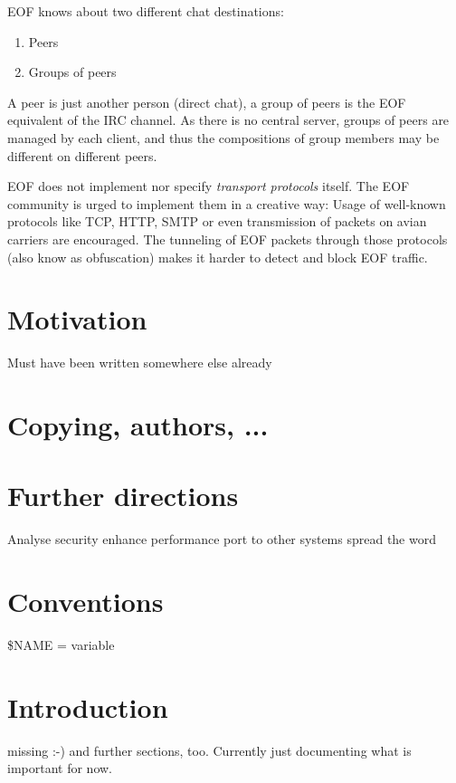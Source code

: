 \documentclass[12pt,a4paper]{book}
\begin{document}
EOF knows about two different chat destinations:
\begin{enumerate}
\item Peers
\item Groups of peers
\end{enumerate}
A peer is just another person (direct chat), a group of peers is the EOF
equivalent of the IRC channel\cite{irc-1}. As there is no central server,
groups of peers are managed by each client, and thus the compositions of
group members may be different on different peers.

EOF does not implement nor specify \emph{transport protocols} itself.
The EOF community is urged to implement them in a creative way: Usage
of well-known protocols like TCP\cite{tcp-1}, HTTP\cite{http-1},
SMTP\cite{smtp-1} or even transmission of packets on avian
carriers\cite{avian-1} are encouraged. The tunneling of EOF packets through
those protocols (also know as obfuscation) makes it harder to detect
and block EOF traffic.
\section{Motivation}
Must have been written somewhere else already
\section{Copying, authors, ...}
\section{Further directions}
Analyse security
enhance performance
port to other systems
spread the word
\section{Conventions}
\$NAME = variable
\section{Introduction}
missing :-)
and further sections, too. Currently just documenting what is important
for now.
\end{document}
